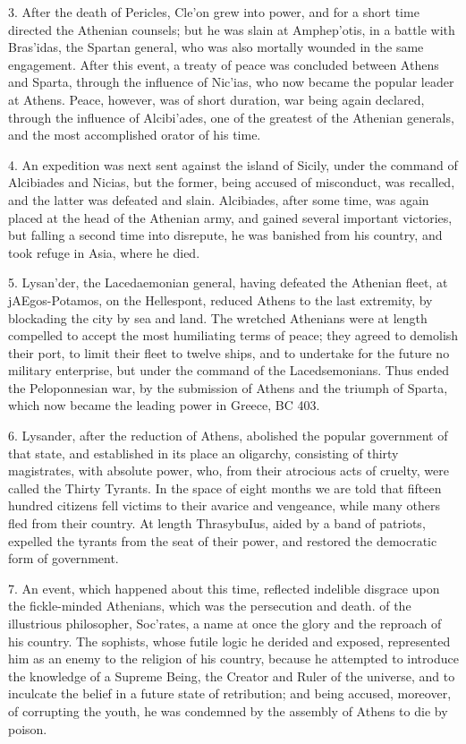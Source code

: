 \documentclass[openany,a4paper]{memoir}
\begin{document}
3. After the death of Pericles, Cle'on grew into power, 
and for a short time directed the Athenian counsels; but he 
was slain at Amphep'otis, in a battle with Bras'idas, the 
Spartan general, who was also mortally wounded in the same 
engagement. After this event, a treaty of peace was concluded between Athens and Sparta, through the influence of 
Nic'ias, who now became the popular leader at Athens. 
Peace, however, was of short duration, war being again declared, through the influence of Alcibi'ades, one of the 
greatest of the Athenian generals, and the most accomplished 
orator of his time. 

4. An expedition was next sent against the island of Sicily, 
under the command of Alcibiades and Nicias, but the former, 
being accused of misconduct, was recalled, and the latter was 
defeated and slain. Alcibiades, after some time, was again 
placed at the head of the Athenian army, and gained several 
important victories, but falling a second time into disrepute, 
he was banished from his country, and took refuge in Asia, 
where he died. 

5. Lysan'der, the Lacedaemonian general, having defeated 
the Athenian fleet, at jAEgos-Potamos, on the Hellespont, reduced Athens to the last extremity, by blockading the city 
by sea and land. The wretched Athenians were at length 
compelled to accept the most humiliating terms of peace; 
they agreed to demolish their port, to limit their fleet to 
twelve ships, and to undertake for the future no military 
enterprise, but under the command of the Lacedsemonians. 
Thus ended the Peloponnesian war, by the submission of 
Athens and the triumph of Sparta, which now became the 
leading power in Greece, BC 403. 

6. Lysander, after the reduction of Athens, abolished the 
popular government of that state, and established in its place 
an oligarchy, consisting of thirty magistrates, with absolute 
power, who, from their atrocious acts of cruelty, were called 
the Thirty Tyrants. In the space of eight months we are 
told that fifteen hundred citizens fell victims to their avarice 
and vengeance, while many others fled from their country. 
At length ThrasybuIus, aided by a band of patriots, expelled 
the tyrants from the seat of their power, and restored the 
democratic form of government. 

7. An event, which happened about this time, reflected indelible disgrace upon the fickle-minded Athenians, which was 
the persecution and death. of the illustrious philosopher, 
Soc'rates, a name at once the glory and the reproach of his 
country. The sophists, whose futile logic he derided and 
exposed, represented him as an enemy to the religion of his 
country, because he attempted to introduce the knowledge 
of a Supreme Being, the Creator and Ruler of the universe, 
and to inculcate the belief in a future state of retribution; 
and being accused, moreover, of corrupting the youth, he was 
condemned by the assembly of Athens to die by poison. 
\end{document}
